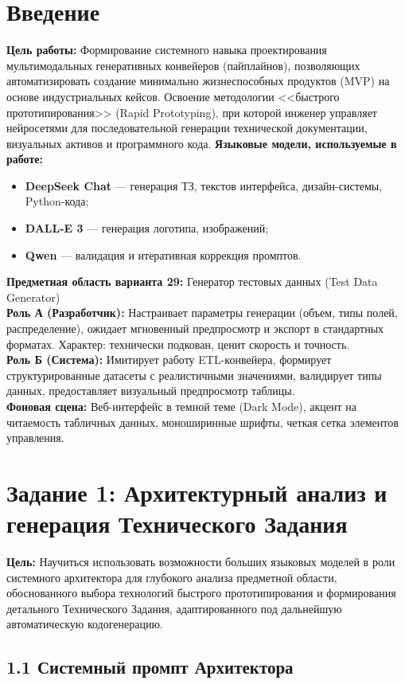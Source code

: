 \documentclass[oneside,a4paper,14pt]{extarticle}
\begin{document}
	\section*{Введение}
	\noindent
	\textbf{Цель работы:} Формирование системного навыка проектирования мультимодальных генеративных конвейеров (пайплайнов), позволяющих автоматизировать создание минимально жизнеспособных продуктов (MVP) на основе индустриальных кейсов. Освоение методологии <<быстрого прототипирования>> (Rapid Prototyping), при которой инженер управляет нейросетями для последовательной генерации технической документации, визуальных активов и программного кода.
	\textbf{Языковые модели, используемые в работе:}
	\begin{itemize}
		\item \textbf{DeepSeek Chat} --- генерация ТЗ, текстов интерфейса, дизайн-системы, Python-кода;
		\item \textbf{DALL-E 3} --- генерация логотипа, изображений;
		\item \textbf{Qwen} --- валидация и итеративная коррекция промптов.
	\end{itemize}
	\textbf{Предметная область варианта 29:} Генератор тестовых данных (Test Data Generator)\\
	\textbf{Роль А (Разработчик):} Настраивает параметры генерации (объем, типы полей, распределение), ожидает мгновенный предпросмотр и экспорт в стандартных форматах. Характер: технически подкован, ценит скорость и точность.\\
	\textbf{Роль Б (Система):} Имитирует работу ETL-конвейера, формирует структурированные датасеты с реалистичными значениями, валидирует типы данных, предоставляет визуальный предпросмотр таблицы.\\
	\textbf{Фоновая сцена:} Веб-интерфейс в темной теме (Dark Mode), акцент на читаемость табличных данных, моноширинные шрифты, четкая сетка элементов управления.
	\newpage
	\section*{Задание 1: Архитектурный анализ и генерация Технического Задания}
	\noindent
	\textbf{Цель:} Научиться использовать возможности больших языковых моделей в роли системного архитектора для глубокого анализа предметной области, обоснованного выбора технологий быстрого прототипирования и формирования детального Технического Задания, адаптированного под дальнейшую автоматическую кодогенерацию.
	\subsection*{1.1 Системный промпт Архитектора}
	
\end{document}

